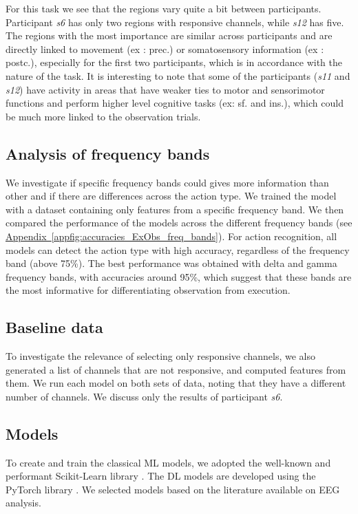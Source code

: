\documentclass[10pt,conference,compsocconf]{IEEEtran}
\newcommand{\aref}[1]{\hyperref[#1]{Appendix~\ref*{#1}}}
\begin{document}
\vspace{-1.5em}
For this task we see that the regions vary quite a bit between participants. Participant \textit{s6} has only two regions with responsive channels, while \textit{s12} has five. The regions with the most importance are similar across participants and are directly linked to movement (ex : prec.)\cite{precentral_gyrus} or somatosensory information (ex : postc.)\cite{postcentral_gyrus}, especially for the first two participants, which is in accordance with the nature of the task. It is interesting to note that some of the participants (\textit{s11} and \textit{s12}) have activity in areas that have weaker ties to motor and sensorimotor functions and perform higher level cognitive tasks (ex: sf. and ins.)\cite{superior_frontal_gyrus}\cite{superior_frontal_gyrus_wikipedia}\cite{insula}, which could be much more linked to the observation trials.

\subsection{Analysis of frequency bands}
We investigate if specific frequency bands could gives more information than other and if there are differences across the action type. We trained the model with a dataset containing only features from a specific frequency band. We then compared the performance of the models across the different frequency bands (see \aref{appfig:accuracies_ExObs_freq_bands}). For action recognition, all models can detect the action type with high accuracy, regardless of the frequency band (above 75\%). The best performance was obtained with delta and gamma frequency bands, with accuracies around 95\%, which suggest that these bands are the most informative for differentiating observation from execution.

\subsection{Baseline data}
To investigate the relevance of selecting only responsive channels, we also generated a list of channels that are not responsive, and computed features from them. We run each model on both sets of data, noting that they have a different number of channels. We discuss only the results of participant \textit{s6}.

\subsection{Models}
To create and train the classical ML models, we adopted the well-known and performant Scikit-Learn library \cite{scikitlearn}. The DL models are developed using the PyTorch library \cite{pytorch}. We selected models based on the literature available on EEG analysis.
\end{document}
